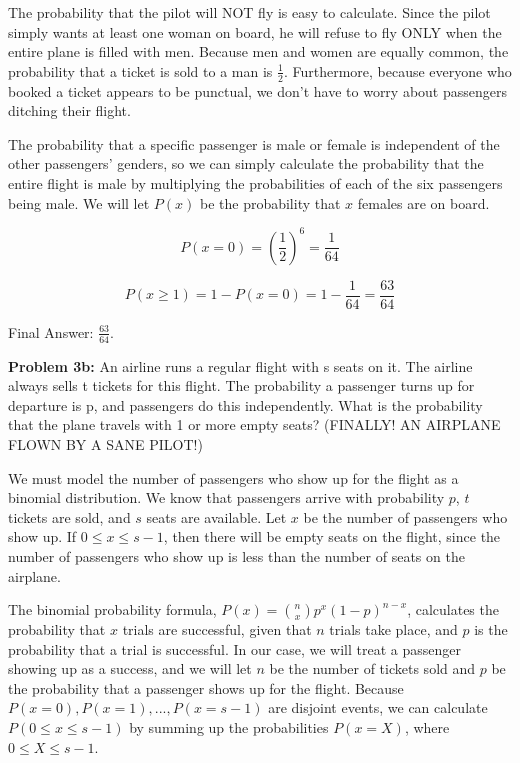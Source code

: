 \documentclass{article}
\begin{document}
 The probability that the pilot will NOT fly is easy to calculate. Since the pilot simply wants at least one woman on board, he will refuse to fly ONLY when the entire plane is filled with men. Because men and women are equally common, the probability that a ticket is sold to a man is $\frac{1}{2}$. Furthermore, because everyone who booked a ticket appears to be punctual, we don't have to worry about passengers ditching their flight.
 
 The probability that a specific passenger is male or female is independent of the other passengers' genders, so we can simply calculate the probability that the entire flight is male by multiplying the probabilities of each of the six passengers being male. We will let $P(x)$ be the probability that $x$ females are on board.
 
 \[P(x=0) = (\frac{1}{2})^6 = \frac{1}{64}\]

 \[P(x \geq 1) = 1 - P(x=0) = 1 - \frac{1}{64} = \frac{63}{64}\] 
 
 Final Answer: $\frac{63}{64}$.\newline
 
 \newpage
 
 \begin{center}
      \Large\textbf{Problem 3b:} An airline runs a regular flight with s seats on it. The airline always sells t tickets for this flight. The probability a passenger turns up for departure is p, and passengers do this independently. What is the probability that the plane travels with 1 or more empty seats? (FINALLY! AN AIRPLANE FLOWN BY A SANE PILOT!)\par
 \end{center}
 
 We must model the number of passengers who show up for the flight as a binomial distribution. We know that passengers arrive with probability $p$, $t$ tickets are sold, and $s$ seats are available. Let $x$ be the number of passengers who show up. If $0 \leq x \leq s - 1$, then there will be empty seats on the flight, since the number of passengers who show up is less than the number of seats on the airplane.
 
 The binomial probability formula, $P(x)={n \choose x}p^x(1-p)^{n-x}$, calculates the probability that $x$ trials are successful, given that $n$ trials take place, and $p$ is the probability that a trial is successful. In our case, we will treat a passenger showing up as a success, and we will let $n$ be the number of tickets sold and $p$ be the probability that a passenger shows up for the flight. Because $P(x=0), P(x=1), ... , P(x=s-1)$ are disjoint events, we can calculate $P(0 \leq x \leq s-1)$ by summing up the probabilities $P(x=X)$, where $0 \leq X \leq s-1$.
 
\end{document}
